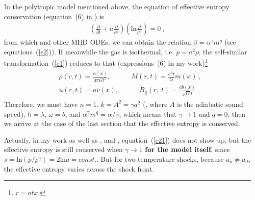 \documentclass[fleqn,usenatbib]{mnras}
\begin{document}
In the polytropic model mentioned above, the equation of effective entropy conservation (equation~(6) in \citet{wang2008dynamic}) is
\begin{gather}
\left(\frac{\partial}{\partial t}+u\frac{\partial}{\partial r}\right)\left(\mathrm{ln}\frac{p}{\rho^{\gamma}}\right)=0\ ,\label{e21}
\end{gather}
from which and other MHD ODEs, we can obtain the relation $\beta=\alpha^{\gamma}m^{q}$ (see equations~(\ref{e2})). If meanwhile the gas is isothermal, i.e. $p=a^{2}\rho$, the self-similar transformation~(\ref{e1}) reduces to that (expressions~(6) in my work)\footnote{$r=atx$.}
\begin{gather}
\begin{split}
&\rho(r,t)=\frac{\alpha(x)}{4\pi Gt^{2}},
 \qquad\quad M(r,t)=\frac{a^{3}t}{G}m(x)\ ,\\
&u(r,t)=av(x), \qquad\quad B_{||}(r,\ t)=\frac{ab(x)}{\sqrt{G}t}\ .
\end{split}\label{e22}
\end{gather}
Therefore, we must have $n=1$, $k=A^{2}=\gamma a^{2}$ (, where $A$ is the adiabatic sound speed), $h=\lambda$, $\omega=b$, and $\alpha^{\gamma}m^{q}=\alpha/\gamma$, which means that $\gamma\rightarrow 1$ and $q=0$, then we arrive at the case of the last section that the effective entropy is conserved.

Actually, in my work as well as \citet{lou2014self}, \citet{yuLou2005} and \citet{yuLou2006}, equation~(\ref{e21}) does not show up, but the effective entropy is still conserved when $\gamma\rightarrow 1$ \textbf{for the model itself}, since $s=\mathrm{ln}\left(p/\rho^{\gamma}\right)=2\mathrm{ln}a=const.$. But for two-temperature shocks, because $a_{u}\neq a_{d}$, the effective entropy varies across the shock front. 
\end{document}
